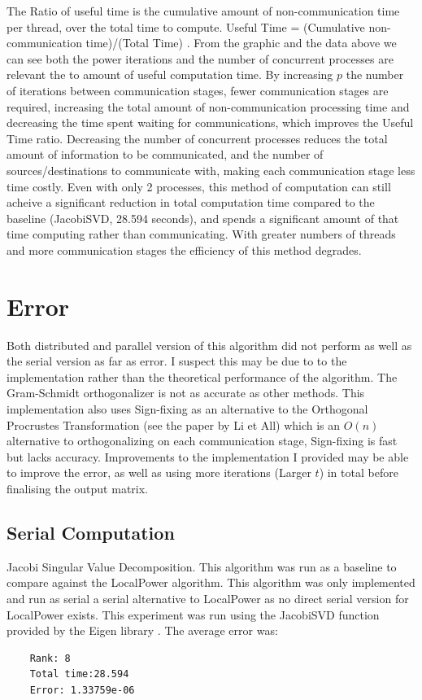 \documentclass[hidelinks]{article}
\begin{document}
\quad The Ratio of useful time is the cumulative amount of non-communication time per thread, over the total time to compute. Useful Time = (Cumulative non-communication time)/(Total Time) .
\newline
From the graphic and the data above we can see both the power iterations and the number of concurrent processes are relevant the to amount of useful computation time. By increasing $p$ the number of iterations between communication stages, fewer communication stages are required, increasing the total amount of non-communication processing time and decreasing the time spent waiting for communications, which improves the Useful Time ratio. Decreasing the number of concurrent processes reduces the total amount of information to be communicated, and the number of sources/destinations to communicate with, making each communication stage less time costly. Even with only 2 processes, this method of computation can still acheive a significant reduction in total computation time compared to the baseline (JacobiSVD, 28.594 seconds), and spends a significant amount of that time computing rather than communicating. With greater numbers of threads and more communication stages the efficiency of this method degrades.

\section{Error} 

Both distributed and parallel version of this algorithm did not perform as well as the serial version as far as error. I suspect this may be due to to the implementation rather than the theoretical performance of the algorithm. The Gram-Schmidt orthogonalizer is not as accurate as other methods. This implementation also uses Sign-fixing as an alternative to the Orthogonal Procrustes Transformation (see the paper by Li et All) \cite{li2021communicationefficientdistributedsvdlocal} which is an $O(n)$ alternative to orthogonalizing on each communication stage, Sign-fixing is fast but lacks accuracy. Improvements to the implementation I provided may be able to improve the error, as well as using more iterations (Larger $t$) in total before finalising the output matrix. 


\subsection{Serial Computation}
Jacobi Singular Value Decomposition. This algorithm was run as a baseline to compare against the LocalPower algorithm. This algorithm was only implemented and run as serial a serial alternative to LocalPower as no direct serial version for LocalPower exists. This experiment was run using the JacobiSVD function provided by the Eigen library \cite{eigen}. The average error was: 
\begin{verbatim}
    Rank: 8
    Total time:28.594
    Error: 1.33759e-06
\end{verbatim}
\end{document}
